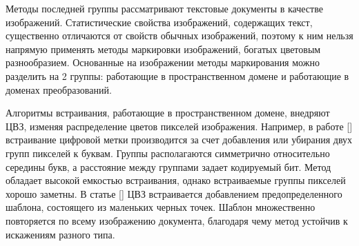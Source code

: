 \documentclass[12pt,a4paper]{article}
\begin{document}
Методы последней группы рассматривают текстовые документы в качестве изображений.
Статистические свойства изображений, содержащих текст, существенно отличаются от свойств обычных изображений, поэтому к ним нельзя напрямую применять методы маркировки изображений, богатых цветовым разнообразием.
Основанные на изображении методы маркирования можно разделить на 2 группы: работающие в пространственном домене и работающие в доменах преобразований.

Алгоритмы встраивания, работающие в пространственном домене, внедряют ЦВЗ, изменяя распределение цветов пикселей изображения.
Например, в работе [] встраивание цифровой метки производится за счет добавления или убирания двух групп пикселей к буквам.
Группы располагаются симметрично относительно середины букв, а расстояние между группами задает кодируемый бит.
Метод обладает высокой емкостью встраивания, однако встраиваемые группы пикселей хорошо заметны.
В статье [] ЦВЗ встраивается добавлением предопределенного шаблона, состоящего из маленьких черных точек.
Шаблон множественно повторяется по всему изображению документа, благодаря чему метод устойчив к искажениям разного типа.
\end{document}
